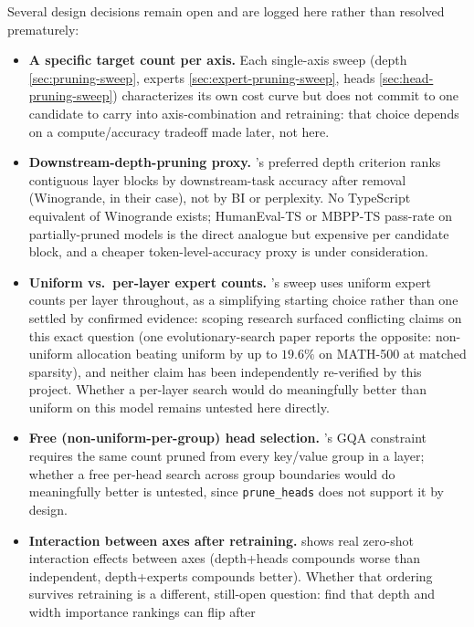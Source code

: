 \documentclass{article}
\theoremstyle{plain}
\theoremstyle{definition}
\theoremstyle{remark}
\begin{document}
Several design decisions remain open and are logged here rather than
resolved prematurely:

\begin{itemize}
\item \textbf{A specific target count per axis.} Each single-axis sweep
  (depth \cref{sec:pruning-sweep}, experts \cref{sec:expert-pruning-sweep},
  heads \cref{sec:head-pruning-sweep}) characterizes its own cost curve
  but does not commit to one candidate to carry into axis-combination and
  retraining: that choice depends on a compute/accuracy tradeoff made
  later, not here.
\item \textbf{Downstream-depth-pruning proxy.} \citet{minitron2024practice}'s
  preferred depth criterion ranks contiguous layer blocks by downstream-task
  accuracy after removal (Winogrande, in their case), not by BI or
  perplexity. No TypeScript equivalent of Winogrande exists; HumanEval-TS or
  MBPP-TS pass-rate on partially-pruned models is the direct analogue but
  expensive per candidate block, and a cheaper token-level-accuracy proxy is
  under consideration.
\item \textbf{Uniform vs.\ per-layer expert counts.} 's
  sweep uses uniform expert counts per layer throughout, as a simplifying
  starting choice rather than one settled by confirmed evidence: scoping
  research surfaced conflicting claims on this exact question (one
  evolutionary-search paper reports the opposite: non-uniform allocation
  beating uniform by up to $19.6\%$ on MATH-500 at matched sparsity), and
  neither claim has been independently re-verified by this project. Whether
  a per-layer search would do meaningfully better than uniform on this
  model remains untested here directly.
\item \textbf{Free (non-uniform-per-group) head selection.}
  's GQA constraint requires the same count
  pruned from every key/value group in a layer; whether a free per-head
  search across group boundaries would do meaningfully better is
  untested, since \texttt{prune\_heads} does not support it by design.
\item \textbf{Interaction between axes after retraining.}
   shows real zero-shot interaction
  effects between axes (depth+heads compounds worse than independent,
  depth+experts compounds better). Whether that ordering survives
  retraining is a different, still-open question: \citet{minitron2024}
  find that depth and width importance rankings can flip after

\end{itemize}
\end{document}
